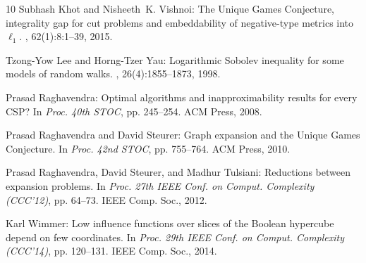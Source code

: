 \documentclass[11pt]{article}
\begin{document}
\begin{thebibliography}{10}
{\sc Subhash Khot and Nisheeth~K. Vishnoi}: The {Unique Games Conjecture},
  integrality gap for cut problems and embeddability of negative-type metrics
  into $\ell_1$.
, 62(1):8:1--39, 2015.
\newblock [\epfmtdoi{10.1145/2629614}]

{\sc Tzong-Yow Lee and Horng-Tzer Yau}: Logarithmic {S}obolev inequality for
  some models of random walks.
, 26(4):1855--1873, 1998.

{\sc Prasad Raghavendra}: Optimal algorithms and inapproximability results for
  every {CSP}?
\newblock In {\em Proc. 40th STOC}, pp. 245--254. ACM Press, 2008.
\newblock [\epfmtdoi{10.1145/1374376.1374414}]

{\sc Prasad Raghavendra and David Steurer}: Graph expansion and the {U}nique
  {G}ames {C}onjecture.
\newblock In {\em Proc. 42nd STOC}, pp. 755--764. ACM Press, 2010.
\newblock [\epfmtdoi{10.1145/1806689.1806792}]

{\sc Prasad Raghavendra, David Steurer, and Madhur Tulsiani}: Reductions
  between expansion problems.
\newblock In {\em Proc. 27th IEEE Conf. on Comput. Complexity (CCC'12)}, pp.
  64--73. IEEE Comp. Soc., 2012.

{\sc Karl Wimmer}: Low influence functions over slices of the {Boolean}
  hypercube depend on few coordinates.
\newblock In {\em Proc. 29th IEEE Conf. on Comput. Complexity (CCC'14)}, pp.
  120--131. IEEE Comp. Soc., 2014.

\end{thebibliography}
\end{document}

